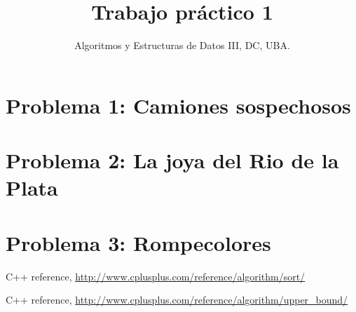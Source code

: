 \documentclass[10pt, a4paper]{article}
\author{Algoritmos y Estructuras de Datos III, DC, UBA.}
\date{}
\title{Trabajo pr\'actico 1}
\begin{document}
\maketitle

\newpage

\tableofcontents

\newpage
\section{Problema 1: Camiones sospechosos}


\newpage
\section{Problema 2: La joya del Rio de la Plata}


\newpage
\section{Problema 3: Rompecolores}


\newpage
\begin{thebibliography}{2}

  C++ reference,
  \url{http://www.cplusplus.com/reference/algorithm/sort/}
  
  C++ reference,
  \url{http://www.cplusplus.com/reference/algorithm/upper_bound/}

  
\end{thebibliography}
\end{document}
